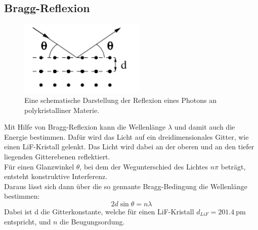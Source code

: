 \subsection{Bragg-Reflexion}

\begin{figure}
    \centering
    \includegraphics[width=6cm]{latex/images/bragg.PNG}
    \caption{Eine schematische Darstellung der Reflexion eines Photons an polykristalliner Materie\protect \cite{V602}.}
    \label{img:comp}
\end{figure}
Mit Hilfe von Bragg-Reflexion kann die Wellenlänge $\lambda$  und damit auch die Energie bestimmen.
Dafür wird das Licht auf ein dreidimensionales Gitter, wie einen LiF-Kristall gelenkt. Das Licht wird dabei an der oberen und an den tiefer liegenden Gitterebenen reflektiert.\\
Für einen Glanzwinkel $\theta$, bei dem der Wegunterschied des Lichtes $n\pi$ beträgt, entsteht konstruktive Interferenz.\\
Daraus lässt sich dann über die so gennante Bragg-Bedingung die Wellenlänge bestimmen:
\begin{equation*}
    2 d \sin \theta =n \lambda
\end{equation*}
Dabei ist d die Gitterkonstante, welche für einen LiF-Kristall $d_{LiF}=\SI{201.4}{\pico\metre}$ entspricht, und $n$ die Beugungsordung.




